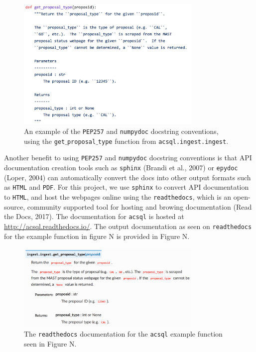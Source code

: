 \documentclass[10pt,journal,compsoc]{IEEEtran}
\begin{document}
\begin{figure}[!t]
\centering
\includegraphics[width=3.5in]{./figures/docstrings.png}
\caption{An example of the \texttt{PEP257} and \texttt{numpydoc} docstring conventions,
using the \texttt{get$\_$proposal$\_$type} function from \texttt{acsql.ingest.ingest}.}
\label{fig1}
\end{figure}

Another benefit to using \texttt{PEP257} and \texttt{numpydoc} docstring conventions is
that API documentation creation tools such as \texttt{sphinx} (Brandi et al., 2007) or
\texttt{epydoc} (Loper, 2004) can automatically convert the docs into other output
formats such as \texttt{HTML} and \texttt{PDF}.  For this project, we use
\texttt{sphinx} to convert API documentation to \texttt{HTML}, and host the webpages online
using the \texttt{readthedocs}, which is an open-source, community supported tool for
hosting and browing documentation (Read the Docs, 2017). The documentation for
\texttt{acsql} is hosted at \url{http://acsql.readthedocs.io/}.  The output documentation
as seen on \texttt{readthedocs} for the example function in figure N is provided in Figure N.

\begin{figure}[!t]
\centering
\includegraphics[width=3.5in]{./figures/readthedocs.png}
\caption{The \texttt{readthedocs} documentation for the \texttt{acsql} example function
seen in Figure N.}
\label{fig1}
\end{figure}
\end{document}

